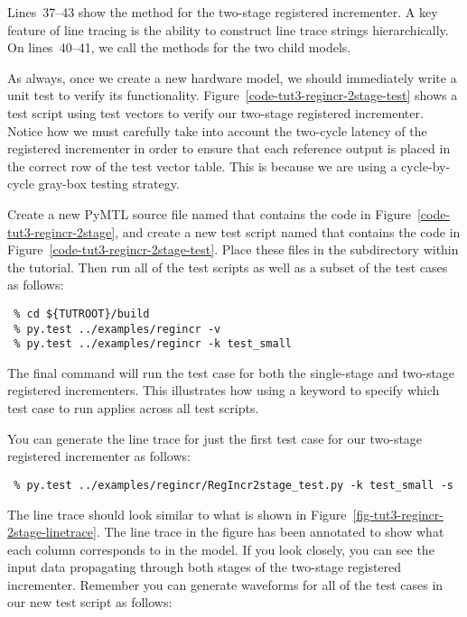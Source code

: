 \documentclass{cbxdoc}
\begin{document}
Lines~37--43 show the  method for the two-stage
registered incrementer. A key feature of line tracing is the ability to
construct line trace strings hierarchically. On lines~40--41, we call the
 methods for the two child  models.

As always, once we create a new hardware model, we should immediately
write a unit test to verify its functionality.
Figure~\ref{code-tut3-regincr-2stage-test} shows a test script using test
vectors to verify our two-stage registered incrementer. Notice how we
must carefully take into account the two-cycle latency of the registered
incrementer in order to ensure that each reference output is placed in
the correct row of the test vector table. This is because we are using a
cycle-by-cycle gray-box testing strategy.

Create a new PyMTL source file named  that contains
the code in Figure~\ref{code-tut3-regincr-2stage}, and create a new test
script named  that contains the code in
Figure~\ref{code-tut3-regincr-2stage-test}. Place these files in the
 subdirectory within the tutorial. Then run all of
the test scripts as well as a subset of the test cases as follows:

\begin{verbatim}
 % cd ${TUTROOT}/build
 % py.test ../examples/regincr -v
 % py.test ../examples/regincr -k test_small
\end{verbatim}

The final command will run the  test case for both the
single-stage and two-stage registered incrementers. This illustrates how
using a keyword to specify which test case to run applies across all test
scripts.

\newpage



You can generate the line trace for just the first test case for our
two-stage registered incrementer as follows:

\begin{verbatim}
 % py.test ../examples/regincr/RegIncr2stage_test.py -k test_small -s
\end{verbatim}

The line trace should look similar to what is shown in
Figure~\ref{fig-tut3-regincr-2stage-linetrace}. The line trace in the
figure has been annotated to show what each column corresponds to in the
model. If you look closely, you can see the input data propagating
through both stages of the two-stage registered incrementer. Remember you
can generate waveforms for all of the test cases in our new test script
as follows:
\end{document}
